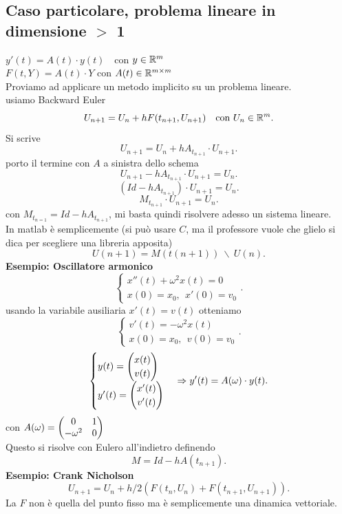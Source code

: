 \documentclass[12px]{article}
\begin{document}
	 \subsection{Caso particolare, problema lineare in dimensione $>$ 1}
	 $y'(t) = A(t)\cdot y(t)\ \ \ $ con  $y\in \mathbb{R}^m$ \\
	 $F(t,Y) = A(t)\cdot Y$ con $A(t)\in \mathbb{R}^{m\times m}$ \\
	 Proviamo ad applicare un metodo implicito su un problema lineare.\\
	 usiamo Backward Euler
	 \[
		 U_{n+1} = U_n + hF(t_{n+1}, U_{n+1})\ \ \text{ con } U_n\in\mathbb{R}^m
	 .\] 
	 Si scrive
	 \[
		 U_{n+1} = U_n + hA_{t_{n+1}}\cdot U_{n+1}
	 .\] 
	 porto il termine con $A$ a sinistra dello schema 
	 \[
	 
		 U_{n+1}- hA_{t_{n+1}}\cdot U_{n+1} = U_n 
	 .\] 
	 \[
		 (Id - hA_{t_{n+1}})\cdot U_{n+1} = U_n
	 .\] 
	 \[
		 M_{t_{n+1}}\cdot U_{n+1} = U_n
	 .\] 
	 con $M_{t_{n=1}} = Id - hA_{t_{n+1}}$, mi basta quindi risolvere adesso un sistema lineare.\\
	 In matlab è semplicemente (si può usare $C$, ma il professore vuole che glielo si dica per scegliere una libreria apposita)
	 \[
		 U(n+1) = M(t(n+1))\  \backslash\  U(n)
	 .\] 
	 \textbf{Esempio: Oscillatore armonico}\\
	 \[
		 \begin{cases}
		x''(t) + \omega^2 x(t) = 0 \\ x(0) = x_0, \ \  x'(0) = v_0
		 \end{cases}
	 .\] 
	 usando la variabile ausiliaria $x'(t) = v(t)$ otteniamo
	 \[
	 \begin{cases}
	 	v'(t) = -\omega^2x(t)\\
		x(0) = x_0, \ \ v(0) = v_0
	 \end{cases}
	 .\] 
	 \[
	 \begin{cases}
	 y(t) = \begin{pmatrix}x(t)\\ v(t)\end{pmatrix}\\
	 y'(t) = \begin{pmatrix}x'(t)\\v'(t)\end{pmatrix}
	 \end{cases} \Rightarrow  y'(t) = A(\omega)\cdot y(t)
	 .\] 
	 con $A(\omega) = \begin{pmatrix}0 & 1\\ -\omega^2 & 0\end{pmatrix}$\\
	 Questo si risolve con Eulero all'indietro definendo
	 \[
		 M = Id- hA(t_{n+1})
	 .\] 
	\textbf{Esempio: Crank Nicholson}
	\[
		U_{n+1} = U_n + h/2(F(t_{n},U_{n})+ F(t_{n+1},U_{n+1}))
	.\]
	La $F$ non è quella del punto fisso ma è semplicemente una dinamica vettoriale.
\end{document}
